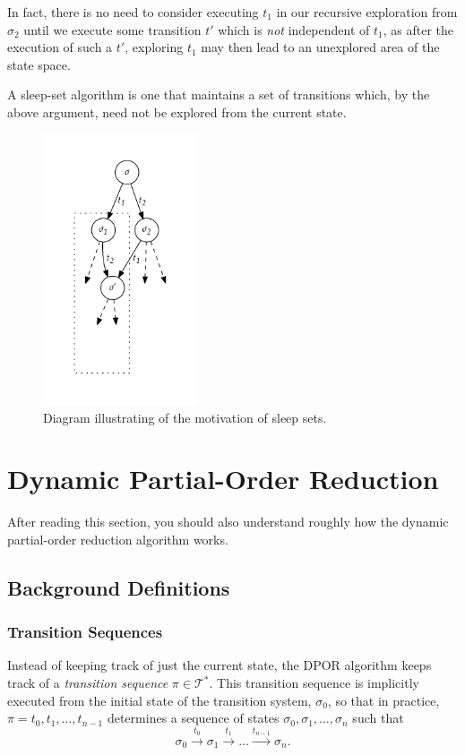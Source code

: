 \documentclass[12pt,a4paper,twoside,openright]{report}
\begin{document}
In fact, there is no need to consider executing
$t_1$ in our recursive exploration from $\sigma_2$
until we execute some transition $t'$ which is
\emph{not} independent of $t_1$, as after
the execution of such a $t'$, exploring $t_1$ may
then lead to an unexplored area of the state space.

A sleep-set algorithm is one that maintains a
set of transitions which, by the above argument,
need not be explored from the current state.

\begin{figure}
	\centering
	\includegraphics[height=8cm]{sleep}
	\caption{Diagram illustrating of the motivation
		of sleep sets.}
	\label{fig:sleep}
\end{figure}

\section{Dynamic Partial-Order Reduction}
\label{sec:dpor-prep}
After reading this section, you should
also understand roughly how the dynamic
partial-order reduction algorithm works.

\subsection{Background Definitions}

\subsubsection{Transition Sequences}
Instead of keeping track of just the current state,
the DPOR algorithm
keeps track of a \emph{transition
sequence} $\pi \in \mathcal{T}^*$. This transition
sequence is implicitly executed from the initial state of
the transition system, $\sigma_0$, so that in practice,
$\pi = t_0, t_1, \ldots, t_{n-1}$ determines a sequence of states
$\sigma_0, \sigma_1, \ldots, \sigma_n$ such that
\[
	\sigma_0 \xrightarrow{\ t_0\ } \sigma_1 \xrightarrow{\ t_1\ }
	\ldots \xrightarrow{t_{n-1}} \sigma_n.
\]
\end{document}
